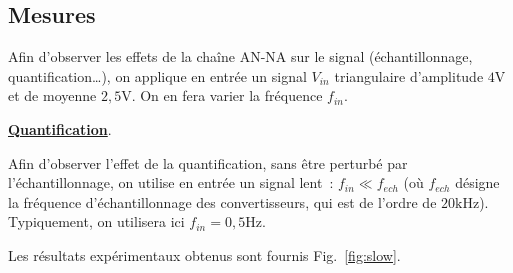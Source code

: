 \documentclass{article}
\begin{document}
\subsection{Mesures}


Afin d'observer les effets de la chaîne AN-NA sur le signal (échantillonnage, quantification\dots), on applique en entrée un signal $V_{in}$ triangulaire d'amplitude $4\mathrm{V}$ et de moyenne $2,5\mathrm{V}$. On en fera varier la fréquence $f_{in}$.

\noindent \textbf{\underline{Quantification}}.

Afin d'observer l'effet de la quantification, sans être perturbé par l'échantillonnage, on utilise en entrée un signal lent~: $f_{in}\ll f_{ech}$ (où $f_{ech}$ désigne la fréquence d'échantillonnage des convertisseurs, qui est de l'ordre de $20\mathrm{kHz}$). Typiquement, on utilisera ici $f_{in} = \mathrm{0,5 Hz}$.

Les résultats expérimentaux obtenus sont fournis Fig.~\ref{fig:slow}.
\end{document}
